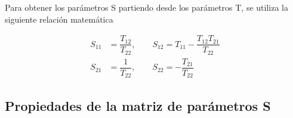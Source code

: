 Para obtener los parámetros S partiendo desde los parámetros T, se utiliza la siguiente relación matemática

\begin{equation}
	\begin{aligned}
		S_{11} &= \dfrac{T_{12}}{T_{22}},\qquad S_{12} = T_{11} - \dfrac{T_{12}T_{21}}{T_{22}} \\
		S_{21} &= \dfrac{1}{T_{22}},\qquad S_{22} = - \dfrac{T_{21}}{T_{22}}
	\end{aligned}
\end{equation}


\subsection{Propiedades de la matriz de parámetros S}

